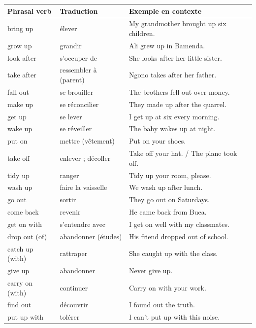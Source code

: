 \documentclass[11pt]{article}
\begin{document}
\begin{center}
\begin{tabularx}{\linewidth}{|l|X|X|}\hline
\rowcolor{popblueL} Phrasal verb & Traduction & Exemple en contexte \\ \hline
bring up & élever & My grandmother brought up six children. \\ \hline
grow up & grandir & Ali grew up in Bamenda. \\ \hline
look after & s'occuper de & She looks after her little sister. \\ \hline
take after & ressembler à (parent) & Ngono takes after her father. \\ \hline
fall out & se brouiller & The brothers fell out over money. \\ \hline
make up & se réconcilier & They made up after the quarrel. \\ \hline
get up & se lever & I get up at six every morning. \\ \hline
wake up & se réveiller & The baby wakes up at night. \\ \hline
put on & mettre (vêtement) & Put on your shoes. \\ \hline
take off & enlever ; décoller & Take off your hat. / The plane took off. \\ \hline
tidy up & ranger & Tidy up your room, please. \\ \hline
wash up & faire la vaisselle & We wash up after lunch. \\ \hline
go out & sortir & They go out on Saturdays. \\ \hline
come back & revenir & He came back from Buea. \\ \hline
get on with & s'entendre avec & I get on well with my classmates. \\ \hline
drop out (of) & abandonner (études) & His friend dropped out of school. \\ \hline
catch up (with) & rattraper & She caught up with the class. \\ \hline
give up & abandonner & Never give up. \\ \hline
carry on (with) & continuer & Carry on with your work. \\ \hline
find out & découvrir & I found out the truth. \\ \hline
put up with & tolérer & I can't put up with this noise. \\ \hline
\end{tabularx}
\end{center}
\end{document}
